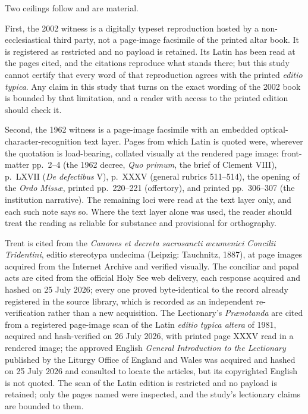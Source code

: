 Two ceilings follow and are material.

First, the 2002 witness is a digitally typeset reproduction hosted by a non-ecclesiastical third party, not a page-image facsimile of the printed altar book. It is registered as restricted and no payload is retained. Its Latin has been read at the pages cited, and the citations reproduce what stands there; but this study cannot certify that every word of that reproduction agrees with the printed \emph{editio typica}. Any claim in this study that turns on the exact wording of the 2002 book is bounded by that limitation, and a reader with access to the printed edition should check it.

Second, the 1962 witness is a page-image facsimile with an embedded optical-character-recognition text layer. Pages from which Latin is quoted were, wherever the quotation is load-bearing, collated visually at the rendered page image: front-matter pp.~2--4 (the 1962 decree, \emph{Quo primum}, the brief of Clement VIII), p.~LXVII (\emph{De defectibus} V), p.~XXXV (general rubrics 511--514), the opening of the \emph{Ordo Missæ}, printed pp.~220--221 (offertory), and printed pp.~306--307 (the institution narrative). The remaining loci were read at the text layer only, and each such note says so. Where the text layer alone was used, the reader should treat the reading as reliable for substance and provisional for orthography.

Trent is cited from the \emph{Canones et decreta sacrosancti œcumenici Concilii Tridentini}, editio stereotypa undecima (Leipzig: Tauchnitz, 1887), at page images acquired from the Internet Archive and verified visually. The conciliar and papal acts are cited from the official Holy See web delivery, each response acquired and hashed on 25 July 2026; every one proved byte-identical to the record already registered in the source library, which is recorded as an independent re-verification rather than a new acquisition. The Lectionary's \emph{Prænotanda} are cited from a registered page-image scan of the Latin \emph{editio typica altera} of 1981, acquired and hash-verified on 26 July 2026, with printed page XXXV read in a rendered image; the approved English \emph{General Introduction to the Lectionary} published by the Liturgy Office of England and Wales was acquired and hashed on 25 July 2026 and consulted to locate the articles, but its copyrighted English is not quoted. The scan of the Latin edition is restricted and no payload is retained; only the pages named were inspected, and the study's lectionary claims are bounded to them.

